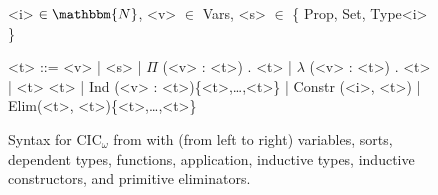 \iffalse
\begin{figure*}
\begin{minipage}{0.40\textwidth}
   
\end{minipage}
\hfill
\begin{minipage}{0.58\textwidth}
   
\end{minipage}
\vspace{-0.4cm}
\caption{A vector (right) is a list (left) indexed by its length.}
\label{fig:listtovect}
\end{figure*}
\fi

\begin{figure*}
\small
\begin{grammar}
<i> $\in \mathbbm{N}$, <v> $\in$ Vars, <s> $\in$ \{ Prop, Set, Type<i> \}

<t> ::= <v> | <s> | $\Pi$ (<v> : <t>) . <t> | $\lambda$ (<v> : <t>) . <t> | <t> <t> | Ind (<v> : <t>)\{<t>,\ldots,<t>\} | Constr (<i>, <t>) | Elim(<t>, <t>)\{<t>,\ldots,<t>\}
\end{grammar}
\vspace{-0.3cm}
\caption{Syntax for CIC$_\omega$ from \citet{Timany2015FirstST} with (from left to right) variables, sorts, dependent types, functions, application, inductive types, inductive constructors, and primitive eliminators.}
\label{fig:syntax}
\end{figure*}

